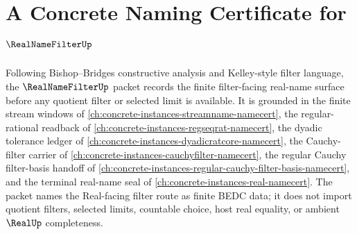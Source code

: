 \chapter{A Concrete Naming Certificate for $\RealNameFilterUp$}
\label{ch:concrete-instances-real-name-filter-namecert}

Following Bishop--Bridges constructive analysis and Kelley-style filter language, the $\RealNameFilterUp$ packet records the finite filter-facing real-name surface before any quotient filter or selected limit is available. It is grounded in the finite stream windows of \autoref{ch:concrete-instances-streamname-namecert}, the regular-rational readback of \autoref{ch:concrete-instances-regseqrat-namecert}, the dyadic tolerance ledger of \autoref{ch:concrete-instances-dyadicratcore-namecert}, the Cauchy-filter carrier of \autoref{ch:concrete-instances-cauchyfilter-namecert}, the regular Cauchy filter-basis handoff of \autoref{ch:concrete-instances-regular-cauchy-filter-basis-namecert}, and the terminal real-name seal of \autoref{ch:concrete-instances-real-namecert}. The packet names the Real-facing filter route as finite BEDC data; it does not import quotient filters, selected limits, countable choice, host real equality, or ambient $\RealUp$ completeness.

